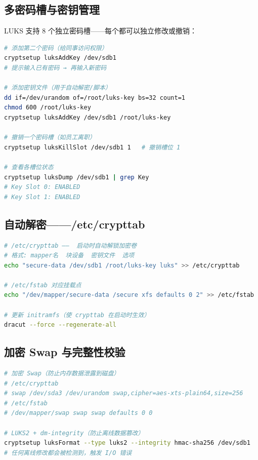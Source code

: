 \documentclass[12pt,UTF8]{ctexbook}
\begin{document}
\subsection{多密码槽与密钥管理}

LUKS 支持 8 个独立密码槽——每个都可以独立修改或撤销：

\begin{lstlisting}[language=bash]
# 添加第二个密码（给同事访问权限）
cryptsetup luksAddKey /dev/sdb1
# 提示输入已有密码 → 再输入新密码

# 添加密钥文件（用于自动解密/脚本）
dd if=/dev/urandom of=/root/luks-key bs=32 count=1
chmod 600 /root/luks-key
cryptsetup luksAddKey /dev/sdb1 /root/luks-key

# 撤销一个密码槽（如员工离职）
cryptsetup luksKillSlot /dev/sdb1 1   # 撤销槽位 1

# 查看各槽位状态
cryptsetup luksDump /dev/sdb1 | grep Key
# Key Slot 0: ENABLED
# Key Slot 1: ENABLED
\end{lstlisting}

\subsection{自动解密——/etc/crypttab}

\begin{lstlisting}[language=bash]
# /etc/crypttab ——  启动时自动解锁加密卷
# 格式: mapper名  块设备  密钥文件  选项
echo "secure-data /dev/sdb1 /root/luks-key luks" >> /etc/crypttab

# /etc/fstab 对应挂载点
echo "/dev/mapper/secure-data /secure xfs defaults 0 2" >> /etc/fstab

# 更新 initramfs（使 crypttab 在启动时生效）
dracut --force --regenerate-all
\end{lstlisting}

\subsection{加密 Swap 与完整性校验}

\begin{lstlisting}[language=bash]
# 加密 Swap（防止内存数据泄露到磁盘）
# /etc/crypttab
# swap /dev/sda3 /dev/urandom swap,cipher=aes-xts-plain64,size=256
# /etc/fstab
# /dev/mapper/swap swap swap defaults 0 0

# LUKS2 + dm-integrity（防止离线数据篡改）
cryptsetup luksFormat --type luks2 --integrity hmac-sha256 /dev/sdb1
# 任何离线修改都会被检测到，触发 I/O 错误
\end{lstlisting}
\end{document}
